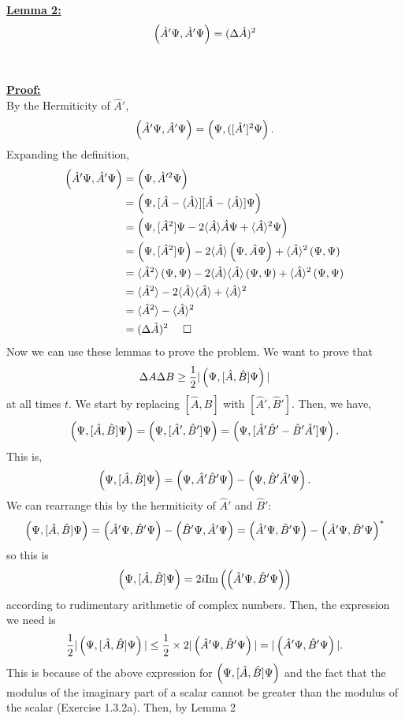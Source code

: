\underline{\textbf{Lemma 2:}}\\
$$\left(\hat{A}'\Psi,\hat{A}'\Psi\right)=(\Delta\hat{A})^2$$
\\\\
\underline{\textbf{Proof:}}\\
By the Hermiticity of $\hat{A}'$,
$$
\left(\hat{A}'\Psi,\hat{A}'\Psi\right)=\left(\Psi,([\hat{A}']^2\Psi\right).
$$
Expanding the definition,
$$
\begin{aligned}
\left(\hat{A}'\Psi,\hat{A}'\Psi\right)&=\left(\Psi,\hat{A}'^2\Psi\right)\\
&=\left(\Psi,[\hat{A}-\langle\hat{A}\rangle][\hat{A}-\langle\hat{A}\rangle]\Psi\right)\\
&=\left(\Psi,[\hat{A}^{2}]\Psi-2\langle\hat{A}\rangle\hat{A}\Psi+\langle\hat{A}\rangle^2\Psi\right)\\
&=\left(\Psi,[\hat{A}^{2}]\Psi\right)-2\langle\hat{A}\rangle\left(\Psi,\hat{A}\Psi\right)+\langle\hat{A}\rangle^2\left(\Psi,\Psi\right)\\
&=\langle\hat{A}^2\rangle\left(\Psi,\Psi\right)-2\langle\hat{A}\rangle\langle\hat{A}\rangle\left(\Psi,\Psi\right)+\langle\hat{A}\rangle^2\left(\Psi,\Psi\right)\\
&= \langle\hat{A}^2\rangle-2\langle\hat{A}\rangle\langle\hat{A}\rangle+\langle\hat{A}\rangle^2\\
&=\langle\hat{A}^2\rangle-\langle\hat{A}\rangle^2\\
&=(\Delta\hat{A})^2 \:\:\:\:\:\:\square
\end{aligned}
$$
Now we can use these lemmas to prove the problem. We want to prove that 
$$
\Delta{A}\Delta{B}\geq\frac{1}{2}|\left(\Psi,[\hat{A},\hat{B}]\Psi\right)|
$$
at all times $t$. We start by replacing $[\hat{A},\hat{B}]$ with $[\hat{A}',\hat{B}']$. Then, we have,
$$
\left(\Psi,[\hat{A},\hat{B}]\Psi\right)=\left(\Psi,[\hat{A}',\hat{B}']\Psi\right)=\left(\Psi,[\hat{A}'\hat{B}'-\hat{B}'\hat{A}']\Psi\right).
$$
This is, 
$$
\left(\Psi,[\hat{A},\hat{B}]\Psi\right)=\left(\Psi,\hat{A}'\hat{B}'\Psi\right)-\left(\Psi,\hat{B}'\hat{A}'\Psi\right)
.$$
We can rearrange this by the hermiticity of $\hat{A}'$ and $\hat{B}'$:
$$
\left(\Psi,[\hat{A},\hat{B}]\Psi\right)=\left(\hat{A}'\Psi,\hat{B}'\Psi\right)-\left(\hat{B}'\Psi,\hat{A}'\Psi\right)=\left(\hat{A}'\Psi,\hat{B}'\Psi\right)-\left(\hat{A}'\Psi,\hat{B}'\Psi\right)^{\ast}
$$
so this is
$$
\left(\Psi,[\hat{A},\hat{B}]\Psi\right)=2i\text{Im}\left(\left(\hat{A}'\Psi,\hat{B}'\Psi\right)\right)
$$
according to rudimentary arithmetic of complex numbers. Then, the expression we need is
$$
\frac{1}{2}|\left(\Psi,[\hat{A},\hat{B}]\Psi\right)|\leq\frac{1}{2}\times2|\left(\hat{A}'\Psi,\hat{B}'\Psi\right)|=|\left(\hat{A}'\Psi,\hat{B}'\Psi\right)|.
$$
This is because of the above expression for $\left(\Psi,[\hat{A},\hat{B}]\Psi\right)$ and the fact that the modulus of the imaginary part of a scalar cannot be greater than the modulus of the scalar (Exercise 1.3.2a). Then, by Lemma 2
